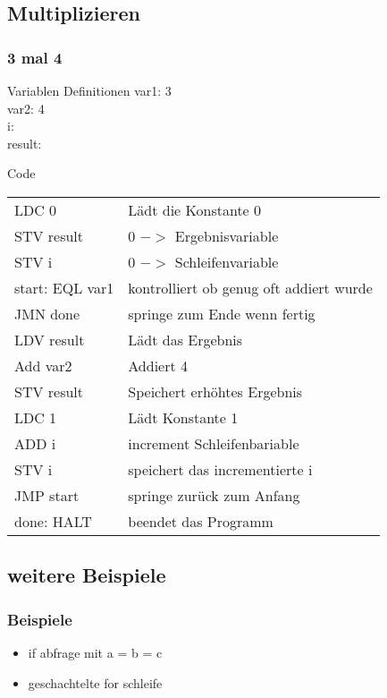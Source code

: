 \documentclass{beamer}
\begin{document}
\subsection{Multiplizieren}
\begin{frame}
	\frametitle{3 mal 4}
	\begin{block}{Variablen Definitionen}
		var1: 3\\
		var2: 4\\
		i:\\
		result:
	\end{block}
\end{frame}

\begin{frame}
	\begin{block}{Code}
		\begin{tabular}{ll}
		 LDC 0 & Lädt die Konstante 0\\
		 STV result	& 0 $->$ Ergebnisvariable\\		 
		 STV i & 0 $->$ Schleifenvariable\\
		 start: EQL var1 & kontrolliert ob genug oft addiert wurde\\
		 JMN done & springe zum Ende wenn fertig\\
		 LDV result & Lädt das Ergebnis\\
		 Add var2 & Addiert 4\\
		 STV result & Speichert erhöhtes Ergebnis\\
		 LDC 1 & Lädt Konstante 1\\
		 ADD i & increment Schleifenbariable\\
		 STV i & speichert das incrementierte i\\
		 JMP start & springe zurück zum Anfang\\
		 done: HALT & beendet das Programm
		 \end{tabular}
	\end{block}
\end{frame}

\subsection{weitere Beispiele}
\begin{frame}
	\frametitle{Beispiele}
	\begin{block}{}
		\begin{itemize}
			\item if abfrage mit a = b = c\\
			\item geschachtelte for schleife
		\end{itemize}
	\end{block}
\end{frame}
\end{document}
